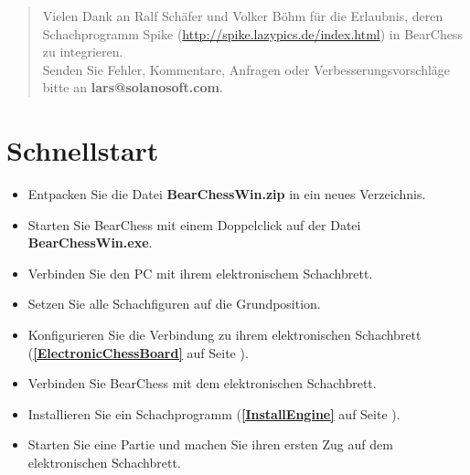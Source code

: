 \documentclass[11pt,a4paper]{article}
\begin{document}
\begin{abstract}
		Vielen Dank an Ralf Schäfer und Volker Böhm für die Erlaubnis, deren Schachprogramm Spike (\url{http://spike.lazypics.de/index.html}) in BearChess zu integrieren.\\
		
		Senden Sie Fehler, Kommentare, Anfragen oder Verbesserungsvorschläge bitte an \textbf{lars@solanosoft.com}.
		
	\end{abstract}
	
	\newpage
	\tableofcontents
	\newpage
	
	
	\section{Schnellstart}
	\begin{itemize}
		\item Entpacken Sie die Datei \textbf{BearChessWin.zip} in ein neues Verzeichnis.
		\item Starten Sie BearChess mit einem Doppelclick auf der Datei\\ \textbf{BearChessWin.exe}.
		\item Verbinden Sie den PC mit ihrem elektronischem Schachbrett.
		\item Setzen Sie alle Schachfiguren auf die Grundposition.
		\item Konfigurieren Sie die Verbindung zu ihrem elektronischen Schachbrett (\textbf{\ref{ElectronicChessBoard}  } auf Seite \pageref{ElectronicChessBoard}).
		\item Verbinden Sie BearChess mit dem elektronischen Schachbrett.
		\item Installieren Sie ein Schachprogramm (\textbf{\ref{InstallEngine}  } auf Seite \pageref{InstallEngine}).
		\item Starten Sie eine Partie und machen Sie ihren ersten Zug auf dem elektronischen Schachbrett.
	\end{itemize}
	
	
\end{document}
